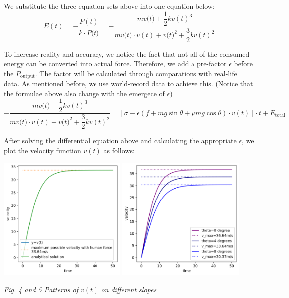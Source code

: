 \documentclass[12pt]{article}
\theoremstyle{definition}
\theoremstyle{remark}
\numberwithin{equation}{section}
\begin{document}
\begin{itemize}
			We substitute the three equation sets above into one equation below:
			\[E (t)=-\dfrac{P (t)}{ k \cdot P \dot(t)}=-\dfrac{mv\ddot(t)+\dfrac{1}{2} k {v(t)}^3}{mv\dot(t)\cdot v(t)+v\dot(t)^2+\dfrac{3}{2} k {v(t)}^2}\]

			To increase reality and accuracy, we notice the fact that not all of the consumed energy can be converted into actual force. Therefore, we add a pre-factor \(\epsilon\) before the \(P_{\mathrm{output}}\). The factor will be calculated through comparations with real-life data. As mentioned before, we use world-record data to achieve this. (Notice that the formulae above also change with the emergece of \(\epsilon\))
			$$ -\dfrac{mv\ddot(t)+\dfrac{1}{2} k {v(t)}^3}{mv\dot(t)\cdot v(t)+v\dot(t)^2+\dfrac{3}{2} k {v(t)}^2} =  \left[\sigma-\epsilon\left(f+mg\sin \theta +\mu mg \cos \theta \right)\cdot v(t)\right]\cdot t+ E _\mathrm{total}$$

			After solving the differential equation above and calculating the appropriate \(\epsilon\), we plot the velocity function \(v\left(t\right)\) as follows:

			\begin{center}
				\includegraphics[height=6cm]{1.png}
				\includegraphics[height=6cm]{2.png}

				\small \textit{Fig. 4 and 5 Patterns of $v(t)$ on different slopes}
			\end{center}


\end{itemize}
\end{document}
